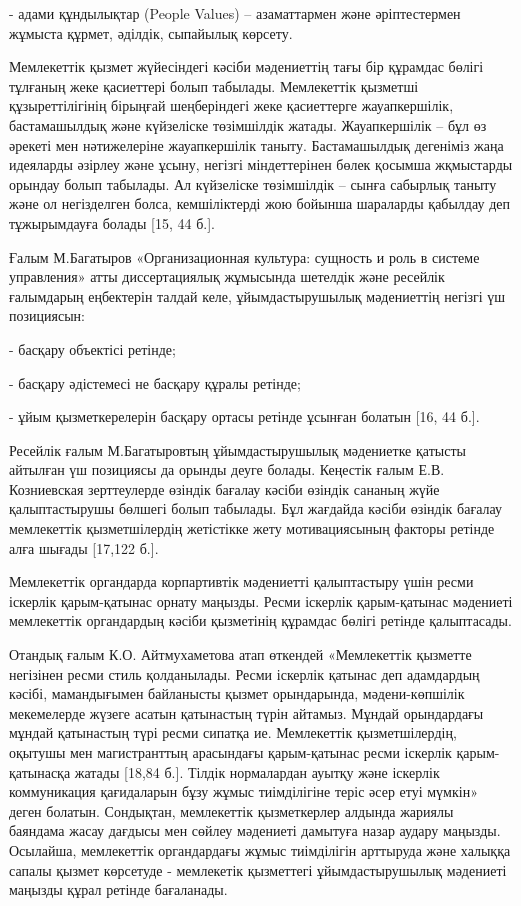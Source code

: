 \begin{multicols}{2}
- адами құндылықтар (People Values) -- азаматтармен және әріптестермен
жұмыста құрмет, әділдік, сыпайылық көрсету.

Мемлекеттік қызмет жүйесіндегі кәсіби мәдениеттің тағы бір құрамдас
бөлігі тұлғаның жеке қасиеттері болып табылады. Мемлекеттік қызметші
құзыреттілігінің бірыңғай шеңберіндегі жеке қасиеттерге жауапкершілік,
бастамашылдық және күйзеліске төзімшілдік жатады. Жауапкершілік -- бұл
өз әрекеті мен нәтижелеріне жауапкершілік таныту. Бастамашылдық
дегеніміз жаңа идеяларды әзірлеу және ұсыну, негізгі міндеттерінен бөлек
қосымша жқмыстарды орындау болып табылады. Ал күйзеліске төзімшілдік --
сынға сабырлық таныту және ол негізделген болса, кемшіліктерді жою
бойынша шараларды қабылдау деп тұжырымдауға болады {[}15, 44 б.{]}.

Ғалым М.Багатыров «Организационная культура: сущность и роль в системе
управления» атты диссертациялық жұмысында шетелдік және ресейлік
ғалымдарың еңбектерін талдай келе, ұйымдастырушылық мәдениеттің негізгі
үш позициясын:

- басқару объектісі ретінде;

- басқару әдістемесі не басқару құралы ретінде;

- ұйым қызметкерелерін басқару ортасы ретінде ұсынған болатын {[}16, 44
б.{]}.

Ресейлік ғалым М.Багатыровтың ұйымдастырушылық мәдениетке қатысты
айтылған үш позициясы да орынды деуге болады. Кеңестік ғалым Е.В.
Козниевская зерттеулерде өзіндік бағалау кәсіби өзіндік сананың жүйе
қалыптастырушы бөлшегі болып табылады. Бұл жағдайда кәсіби өзіндік
бағалау мемлекеттік қызметшілердің жетістікке жету мотивациясының
факторы ретінде алға шығады {[}17,122 б.{]}.

Мемлекеттік органдарда корпартивтік мәдениетті қалыптастыру үшін ресми
іскерлік қарым-қатынас орнату маңызды. Ресми іскерлік қарым-қатынас
мәдениеті мемлекеттік органдардың кәсіби қызметінің құрамдас бөлігі
ретінде қалыптасады.

Отандық ғалым К.О. Айтмухаметова атап өткендей «Мемлекеттік қызметте
негізінен ресми стиль қолданылады. Ресми іскерлік қатынас деп адамдардың
кәсібі, мамандығымен байланысты қызмет орындарында, мәдени-көпшілік
мекемелерде жүзеге асатын қатынастың түрін айтамыз. Мұндай орындардағы
мұндай қатынастың түрі ресми сипатқа ие. Мемлекеттік қызметшілердің,
оқытушы мен магистранттың арасындағы қарым-қатынас ресми іскерлік
қарым-қатынасқа жатады {[}18,84 б.{]}. Тілдік нормалардан ауытқу және
іскерлік коммуникация қағидаларын бұзу жұмыс тиімділігіне теріс әсер
етуі мүмкін» деген болатын. Сондықтан, мемлекеттік қызметкерлер алдында
жариялы баяндама жасау дағдысы мен сөйлеу мәдениеті дамытуға назар
аудару маңызды. Осылайша, мемлекеттік органдардағы жұмыс тиімділігін
арттыруда және халыққа сапалы қызмет көрсетуде - мемлекетік қызметтегі
ұйымдастырушылық мәдениеті маңызды құрал ретінде бағаланады.


\end{multicols}
